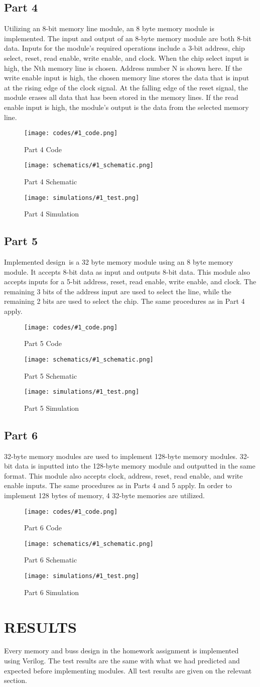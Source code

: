 \documentclass[pdftex,12pt,a4paper]{article}
\theoremstyle{plain}
\newcommand{\parts}[1]{
    \begin{figure}[H]
    	\centering
    	\texttt{[image: codes/\#1\_code.png]}
    	\caption{#1 Code}
    	\label{fig7}
        \end{figure}
    \begin{figure}[H]
    	\centering
    	\texttt{[image: schematics/\#1\_schematic.png]}
    	\caption{#1 Schematic}
    	\label{fig7}
        \end{figure}
    \begin{figure}[H]
    	\centering
    	\texttt{[image: simulations/\#1\_test.png]}
    	\caption{#1 Simulation}
    	\label{fig7}
\end{figure}
}
\begin{document}
    \subsection{Part 4}
    Utilizing an 8-bit memory line module, an 8 byte memory module is implemented. The input and output of an 8-byte memory module are both 8-bit data. Inputs for the module's required operations include a 3-bit address, chip select, reset, read enable, write enable, and clock. When the chip select input is high, the Nth memory line is chosen. Address number N is shown here. If the write enable input is high, the chosen memory line stores the data that is input at the rising edge of the clock signal. At the falling edge of the reset signal, the module erases all data that has been stored in the memory lines. If the read enable input is high, the module's output is the data from the selected memory line. 
        \parts{Part 4}
    \subsection{Part 5}
        Implemented design is a 32 byte memory module using an 8 byte memory module. It accepts 8-bit data as input and outputs 8-bit data. This module also accepts inputs for a 5-bit address, reset, read enable, write enable, and clock. The remaining 3 bits of the address input are used to select the line, while the remaining 2 bits are used to select the chip. The same procedures as in Part 4 apply.
        \parts{Part 5}
    \subsection{Part 6}
        32-byte memory modules are used to implement 128-byte memory modules. 32-bit data is inputted into the 128-byte memory module and outputted in the same format. This module also accepts clock, address, reset, read enable, and write enable inputs. The same procedures as in Parts 4 and 5 apply. In order to implement 128 bytes of memory, 4 32-byte memories are utilized.
        \parts{Part 6}
    
\section{RESULTS}
Every memory and buss design in the homework assignment is implemented using Verilog. The test results are  the same with what we had predicted and expected before implementing modules. All test results are given on the relevant section.
\end{document}

